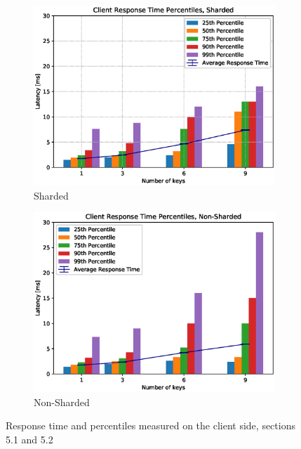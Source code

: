 \documentclass[11pt,a4paper]{article}
\begin{document}
\begin{figure}
    \begin{subfigure}{.5\textwidth}
        \includegraphics[width=1\linewidth]{plots/logSection5c_latencyPercentilesMemtier.eps}
        \caption{Sharded}
    \end{subfigure}
    \begin{subfigure}{.5\textwidth}
        \includegraphics[width=1\linewidth]{plots/logSection5d_latencyPercentilesMemtier.eps}
        \caption{Non-Sharded}
    \end{subfigure}

    \caption{Response time and percentiles measured on the client side, sections 5.1 and 5.2}
    \label{fig:5-latencyPercentiles}
\end{figure}
\end{document}

